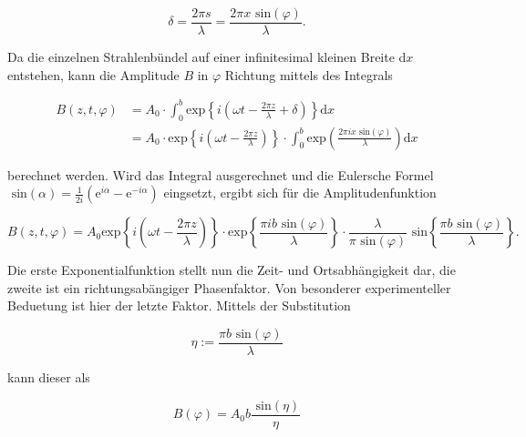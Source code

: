         \begin{equation*}
            \delta = \frac{2 \pi s}{\lambda} = \frac{2 \pi x \text{ sin}(\varphi)}{\lambda}.
        \end{equation*}

        \noindent Da die einzelnen Strahlenbündel auf einer infinitesimal kleinen Breite d$x$ entstehen, kann die Amplitude $B$ in 
        $\varphi$ Richtung mittels des Integrals 
        
        \begin{align*}
            B(z,t,\varphi) &= A_0 \cdot \int_0^b \text{exp}\left\{ i \left( \omega t - \frac{2 \pi z}{\lambda} + \delta \right) \right\} \text{d}x \\
                           &= A_0 \cdot \text{exp}\left\{ i \left( \omega t - \frac{2 \pi z}{\lambda} \right) \right\} \cdot \int_0^b 
                           \text{exp}\left( \frac{2 \pi i x \text{ sin} (\varphi)}{\lambda }\right) \text{d}x
        \end{align*}

        \noindent berechnet werden. Wird das Integral ausgerechnet und die Eulersche Formel $\text{ sin}(\alpha) = \frac{1}{2i}\left( 
        \text{e}^{i \alpha} - \text{e}^{-i \alpha} \right)$ eingsetzt, ergibt sich für die Amplitudenfunktion

        \begin{equation}
            B(z,t,\varphi) = A_0 \text{exp}\left\{ i \left( \omega t - \frac{2 \pi z}{\lambda} \right) \right\} \cdot
            \text{exp}\left\{ \frac{\pi i b \text{ sin}(\varphi)}{\lambda} \right\} \cdot \frac{\lambda}{\pi\text{ sin}(\varphi)}
            \text{ sin}\left\{ \frac{\pi b \text{ sin}(\varphi)}{\lambda} \right\}.
            \label{eqn:beug}
        \end{equation}

        \noindent Die erste Exponentialfunktion stellt nun die Zeit- und Ortsabhängigkeit dar, die zweite ist ein richtungsabängiger 
        Phasenfaktor. Von besonderer experimenteller Beduetung ist hier der letzte Faktor. Mittels der Substitution 

        \begin{equation*}
            \eta := \frac{\pi b \text{ sin}(\varphi)}{\lambda}
        \end{equation*}
        
        \noindent kann dieser als 

        \begin{equation*}
            B(\varphi) = A_0 b \frac{\text{ sin}(\eta)}{\eta}
        \end{equation*}

